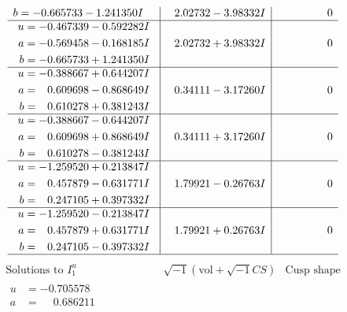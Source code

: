 \documentclass[1p]{elsarticle_modified}
\theoremstyle{definition}
\newcommand{\I}{\sqrt{-1}}
\begin{document}
$$\begin{array}{c|c|c}
\begin{aligned}
b &= -0.665733 - 1.241350 I\end{aligned}
 & \phantom{-}2.02732 - 3.98332 I & \phantom{-0.000000 } 0 \\ \hline\begin{aligned}
u &= -0.467339 - 0.592282 I \\
a &= -0.569458 - 0.168185 I \\
b &= -0.665733 + 1.241350 I\end{aligned}
 & \phantom{-}2.02732 + 3.98332 I & \phantom{-0.000000 } 0 \\ \hline\begin{aligned}
u &= -0.388667 + 0.644207 I \\
a &= \phantom{-}0.609698 - 0.868649 I \\
b &= \phantom{-}0.610278 + 0.381243 I\end{aligned}
 & \phantom{-}0.34111 - 3.17260 I & \phantom{-0.000000 } 0 \\ \hline\begin{aligned}
u &= -0.388667 - 0.644207 I \\
a &= \phantom{-}0.609698 + 0.868649 I \\
b &= \phantom{-}0.610278 - 0.381243 I\end{aligned}
 & \phantom{-}0.34111 + 3.17260 I & \phantom{-0.000000 } 0 \\ \hline\begin{aligned}
u &= -1.259520 + 0.213847 I \\
a &= \phantom{-}0.457879 - 0.631771 I \\
b &= \phantom{-}0.247105 + 0.397332 I\end{aligned}
 & \phantom{-}1.79921 - 0.26763 I & \phantom{-0.000000 } 0 \\ \hline\begin{aligned}
u &= -1.259520 - 0.213847 I \\
a &= \phantom{-}0.457879 + 0.631771 I \\
b &= \phantom{-}0.247105 - 0.397332 I\end{aligned}
 & \phantom{-}1.79921 + 0.26763 I & \phantom{-0.000000 } 0\\
 \hline 
 \end{array}$$\newpage$$\begin{array}{c|c|c}  
\text{Solutions to }I^u_{1}& \I (\text{vol} + \sqrt{-1}CS) & \text{Cusp shape}\\
 \hline 
\begin{aligned}
u &= -0.705578\phantom{ +0.000000I} \\
a &= \phantom{-}0.686211\phantom{ +0.000000I} \\

\end{aligned}
\end{array}$$
\end{document}
